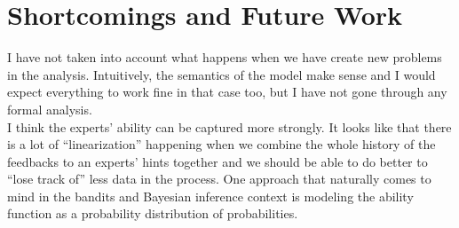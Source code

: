 \documentclass[conference]{IEEEtran}
\begin{document}
	
	\section{Shortcomings and Future Work}
	I have not taken into account what happens when we have create new problems in the analysis. Intuitively, the semantics of the model
	make sense and I would expect everything to work fine in that case too, but I have not gone through any formal analysis.\\
	I think the experts' ability can be captured more strongly. It looks like that there is a lot of ``linearization'' happening when
	we combine the whole history of the feedbacks to an experts' hints together and we should be able to do better to ``lose track of''
	less data in the process. One approach that naturally comes to mind in the bandits and Bayesian inference context is modeling the
	ability function as a probability distribution of probabilities.

	
%	
	
%	
%	
	
	
	
\end{document}
